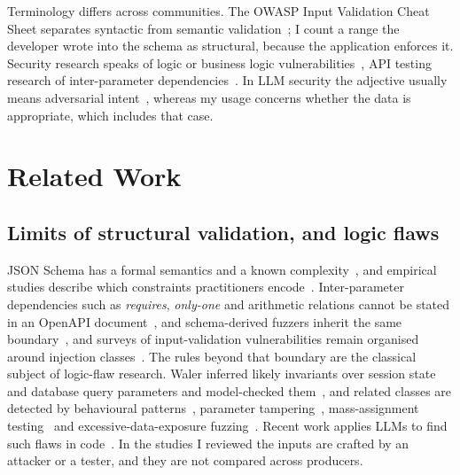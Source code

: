 \documentclass[conference]{IEEEtran}
\begin{document}
Terminology differs across communities. The OWASP Input Validation Cheat Sheet separates syntactic from
semantic validation~\cite{owasp2026inputvalidation}; I count a range the developer wrote into the schema
as structural, because the application enforces it. Security research speaks of logic or business logic
vulnerabilities~\cite{felmetsger2010waler,pellegrino2014logicflaws,metin2025blv}, API testing research of
inter-parameter dependencies~\cite{martinlopez2022idl,martinlopez2019catalogue}. In LLM
security the adjective usually means adversarial intent~\cite{singh2026injectioninteraction}, whereas my
usage concerns whether the data is appropriate, which includes that case.

\section{Related Work}
\label{sec:related}

\subsection{Limits of structural validation, and logic flaws}
JSON Schema has a formal semantics and a known
complexity~\cite{pezoa2016foundations,attouche2023jsonschema}, and empirical studies describe which
constraints practitioners encode~\cite{baazizi2021usagenot}. Inter-parameter dependencies such as
\emph{requires}, \emph{only-one} and arithmetic relations cannot be stated in an OpenAPI
document~\cite{martinlopez2022idl,martinlopez2019catalogue}, and schema-derived fuzzers inherit the
same boundary~\cite{hatfielddodds2021schemathesis}, and surveys of input-validation vulnerabilities
remain organised around injection classes~\cite{fadlalla2023inputvalidation}. The rules beyond that
boundary are the classical subject of logic-flaw research. Waler inferred likely invariants over
session state and database query parameters and model-checked them~\cite{felmetsger2010waler}, and
related classes are detected by behavioural patterns~\cite{pellegrino2014logicflaws}, parameter
tampering~\cite{bisht2010notamper}, mass-assignment testing~\cite{corradini2023massassignment} and
excessive-data-exposure fuzzing~\cite{pan2024edefuzz}. Recent work applies LLMs to find such flaws in code~\cite{metin2025blv}. In the studies I reviewed the
inputs are crafted by an attacker or a tester, and they are not compared across producers.
\end{document}
